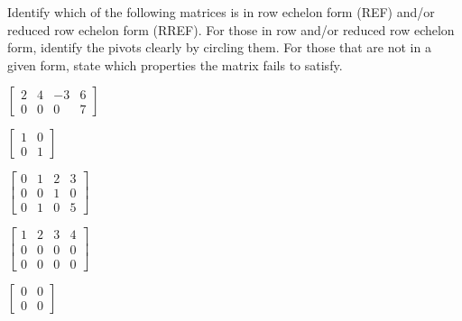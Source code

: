 \begin{activity} \label{act:1_c_1} Identify which of the following matrices is in row echelon form (REF) and/or reduced row echelon form (RREF). For those in row and/or reduced row echelon form, identify the pivots clearly by circling them. For those that are not in a given form, state which properties the matrix fails to satisfy. 

\ba
\begin{minipage}{1.75in}
 \item $\left[ \begin{array}{ccrc} 2 & 4 & -3 & 6 \\ 0 & 0 & 0 & 7 \end{array} \right]$ 
\end{minipage}
\begin{minipage}{1.5in}
\item $\left[ \begin{array}{cc} 1 & 0  \\ 0 & 1 \end{array} \right]$ 
\end{minipage}
\begin{minipage}{1.5in}
\item $\left[ \begin{array}{cccc} 0 & 1 & 2 & 3 \\ 0 & 0 & 1 & 0 \\ 0 & 1 & 0 & 5 \end{array} \right]$ 
\end{minipage} 

\begin{minipage}{1.75in}
\item $\left[ \begin{array}{cccc} 1 & 2 & 3 & 4 \\ 0 & 0 & 0 & 0 \\ 0 & 0 & 0 & 0 \end{array} \right]$ 
\end{minipage}
\begin{minipage}{1.5in}
\item $\left[ \begin{array}{cc} 0 & 0 \\ 0 & 0 \end{array} \right]$ 
\end{minipage}
\ea 

\end{activity}



